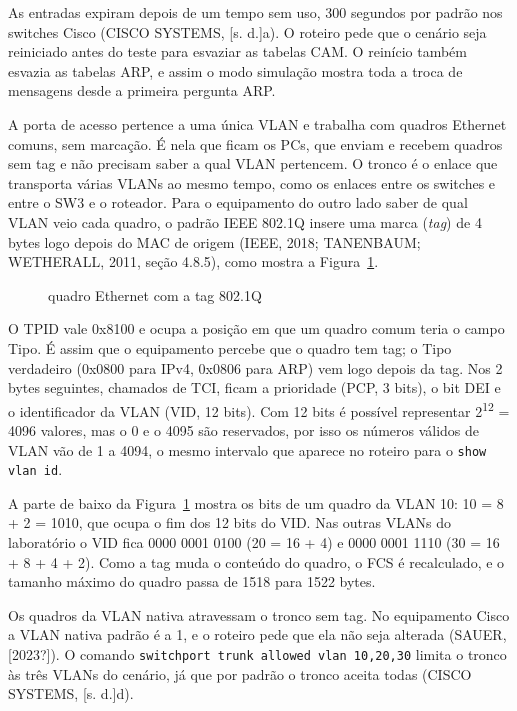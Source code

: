 As entradas expiram depois de um tempo sem uso, 300 segundos por padrão nos switches Cisco (CISCO SYSTEMS, [s. d.]a). O roteiro pede que o cenário seja reiniciado antes do teste para esvaziar as tabelas CAM. O reinício também esvazia as tabelas ARP, e assim o modo simulação mostra toda a troca de mensagens desde a primeira pergunta ARP.


A porta de acesso pertence a uma única VLAN e trabalha com quadros Ethernet comuns, sem marcação. É nela que ficam os PCs, que enviam e recebem quadros sem tag e não precisam saber a qual VLAN pertencem. O tronco é o enlace que transporta várias VLANs ao mesmo tempo, como os enlaces entre os switches e entre o SW3 e o roteador. Para o equipamento do outro lado saber de qual VLAN veio cada quadro, o padrão IEEE 802.1Q insere uma marca (\emph{tag}) de 4 bytes logo depois do MAC de origem (IEEE, 2018; TANENBAUM; WETHERALL, 2011, seção 4.8.5), como mostra a Figura~\ref{fig:quadro}.

\begin{figure}[H]
\captionsetup{position=top}
\caption{quadro Ethernet com a tag 802.1Q}\label{fig:quadro}
\centering

\end{figure}

O TPID vale 0x8100 e ocupa a posição em que um quadro comum teria o campo Tipo. É assim que o equipamento percebe que o quadro tem tag; o Tipo verdadeiro (0x0800 para IPv4, 0x0806 para ARP) vem logo depois da tag. Nos 2 bytes seguintes, chamados de TCI, ficam a prioridade (PCP, 3 bits), o bit DEI e o identificador da VLAN (VID, 12 bits). Com 12 bits é possível representar 2\textsuperscript{12} = 4096 valores, mas o 0 e o 4095 são reservados, por isso os números válidos de VLAN vão de 1 a 4094, o mesmo intervalo que aparece no roteiro para o \texttt{show vlan id}.

A parte de baixo da Figura~\ref{fig:quadro} mostra os bits de um quadro da VLAN 10: 10 = 8 + 2 = 1010, que ocupa o fim dos 12 bits do VID. Nas outras VLANs do laboratório o VID fica 0000 0001 0100 (20 = 16 + 4) e 0000 0001 1110 (30 = 16 + 8 + 4 + 2). Como a tag muda o conteúdo do quadro, o FCS é recalculado, e o tamanho máximo do quadro passa de 1518 para 1522 bytes.

Os quadros da VLAN nativa atravessam o tronco sem tag. No equipamento Cisco a VLAN nativa padrão é a 1, e o roteiro pede que ela não seja alterada (SAUER, [2023?]). O comando \texttt{switchport trunk allowed vlan 10,20,30} limita o tronco às três VLANs do cenário, já que por padrão o tronco aceita todas (CISCO SYSTEMS, [s. d.]d).

